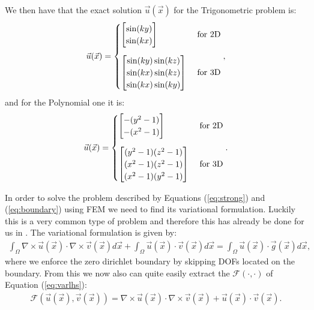 We then have that the exact solution \(\vec u (\vec x )\) for the Trigonometric problem is:
\begin{align}
    \vec{u}(\vec x) = 
    \begin{cases}
        \begin{bmatrix}
            \sin(k y)\\ \sin(k x)
        \end{bmatrix} & \text{ for 2D}\\
        \noalign{\vskip9pt}
        \begin{bmatrix}
            \sin(k y)\sin(k z) \\
            \sin(k x)\sin(k z) \\
            \sin(k x)\sin(k y)
        \end{bmatrix} & \text{ for 3D}\\
    \end{cases}\text{,}
\end{align}
and for the Polynomial one it is:
\begin{align}
    \vec{u}(\vec x) = 
    \begin{cases}
        \begin{bmatrix}
            - (y^2 - 1)\\ - (x^2 - 1)
        \end{bmatrix}& \text{ for 2D}\\
        \noalign{\vskip9pt}
        \begin{bmatrix}
            (y^2 - 1) (z^2 - 1) \\
            (x^2 - 1) (z^2 - 1) \\
            (x^2 - 1) (y^2 - 1)
        \end{bmatrix}& \text{ for 3D}
    \end{cases}\text{.}
\end{align}
\medskip

In order to solve the problem described by Equations (\ref{eq:strong}) and (\ref{eq:boundary}) using FEM we need to find its variational formulation. Luckily this is a very common type of problem and therefore this has already be done for us in \cite{maxwellBook}. The variational formulation is given by:
\begin{align}
    \int_{\Omega} \nabla \times \vec u(\vec x) \cdot \nabla \times \vec v(\vec x) d\vec x + \int_{\Omega} \vec u(\vec x) \cdot \vec v(\vec x) d\vec x = \int_{\Omega} \vec u(\vec x) \cdot \vec g(\vec x) d\vec x \text{, }\label{eq:varita}
\end{align}
where we enforce the zero dirichlet boundary by skipping DOFs located on the boundary. From this we now also can quite easily extract the \(\mathcal F (\cdot, \cdot)\) of Equation (\ref{eq:varlhs}):
\begin{align}
    \mathcal{F}\left(\vec u (\vec x), \vec v (\vec x)\right) = \nabla \times \vec u(\vec x) \cdot \nabla \times \vec v(\vec x) + \vec u(\vec x) \cdot \vec v(\vec x) \text{.}
\end{align}\medskip

